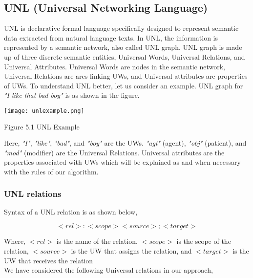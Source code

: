 \subsection{UNL (Universal Networking Language)}

UNL is declarative formal language specifically designed to represent semantic data extracted from natural language texts. In UNL, the information is represented by 
a semantic network, also called UNL graph. UNL graph is made up of three discrete semantic entities, Universal Words, Universal Relations, and Universal Attributes. 
Universal Words are nodes in the semantic network, Universal Relations are arcs linking UWs, and Universal attributes are properties of UWs. To understand UNL better, 
let us consider an example. UNL graph for \textit{"I like that bad boy"} is as shown in the figure.
  
\texttt{[image: unlexample.png]} 
\begin{center}
 Figure 5.1 UNL Example
\end{center}
  
Here, \textit{"I"}, \textit{"like"}, \textit{"bad"}, and \textit{"boy"} are the UWs. \textit{"agt"} (agent), \textit{"obj"} (patient), and \textit{"mod"} (modifier) are the
Universal Relations. Universal attributes are the properties associated with UWs which will be explained as and when necessary with the rules of our algorithm.
  
\subsubsection*{UNL relations}

Syntax of a UNL relation is as shown below,
    
\[\label{eqn:unlsyntax}
   <rel>:<scope><source>;<target>
\]
  
Where, \(<rel>\) is the name of the relation, \(<scope>\) is the scope of the relation, \(<source>\) is the UW that assigns the relation, and \(<target>\) is the UW that receives the relation \\
  
We have considered the following Universal relations in our approach,

